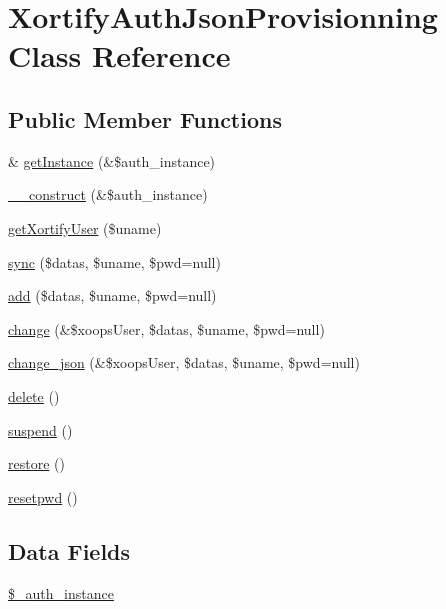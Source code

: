 \hypertarget{class_xortify_auth_json_provisionning}{\section{Xortify\-Auth\-Json\-Provisionning Class Reference}
\label{class_xortify_auth_json_provisionning}
}
\subsection*{Public Member Functions}
\begin{DoxyCompactItemize}
\item 
\& \hyperlink{class_xortify_auth_json_provisionning_a2c8eaa915c70d75289ac8a03686194f9}{get\-Instance} (\&\$auth\-\_\-instance)
\item 
\hyperlink{class_xortify_auth_json_provisionning_a0f25832dc86774e7605b81fe57b083c2}{\-\_\-\-\_\-construct} (\&\$auth\-\_\-instance)
\item 
\hyperlink{class_xortify_auth_json_provisionning_a041d726ac26672547ed1504e8e0117aa}{get\-Xortify\-User} (\$uname)
\item 
\hyperlink{class_xortify_auth_json_provisionning_a35dc08b0f2138eb818ff95345b73bcff}{sync} (\$datas, \$uname, \$pwd=null)
\item 
\hyperlink{class_xortify_auth_json_provisionning_adfc9fcef01e7bd7b2f47e8e79d51fc63}{add} (\$datas, \$uname, \$pwd=null)
\item 
\hyperlink{class_xortify_auth_json_provisionning_ae1f0971b9712c794620cf309164e43af}{change} (\&\$xoops\-User, \$datas, \$uname, \$pwd=null)
\item 
\hyperlink{class_xortify_auth_json_provisionning_a94f4e0408f26e65abca347ec883f4ec9}{change\-\_\-json} (\&\$xoops\-User, \$datas, \$uname, \$pwd=null)
\item 
\hyperlink{class_xortify_auth_json_provisionning_a13bdffdd926f26b825ea57066334ff01}{delete} ()
\item 
\hyperlink{class_xortify_auth_json_provisionning_ad73006a505121228f3b075c2409787d2}{suspend} ()
\item 
\hyperlink{class_xortify_auth_json_provisionning_aa1371f22826cf8cde4454c9b467203d0}{restore} ()
\item 
\hyperlink{class_xortify_auth_json_provisionning_a06d70fbd3a2db390b6f2530c0076628e}{resetpwd} ()
\end{DoxyCompactItemize}
\subsection*{Data Fields}
\begin{DoxyCompactItemize}
\item 
\hyperlink{class_xortify_auth_json_provisionning_a486ed878bb5a7188c99ac4c9ee46ac6e}{\$\-\_\-auth\-\_\-instance}
\end{DoxyCompactItemize}


